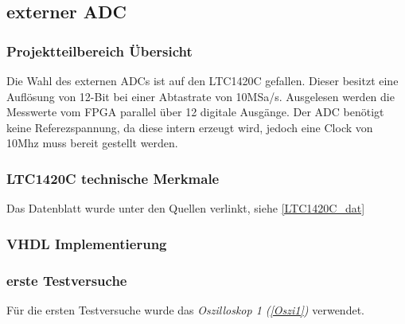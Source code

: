 \subsection{externer ADC}\label{extADC}
\subsubsection{Projektteilbereich Übersicht}
 Die Wahl des externen ADCs ist auf den LTC1420C gefallen. Dieser besitzt eine Auflösung von 12-Bit bei einer Abtastrate von 10MSa/s.  Ausgelesen werden die Messwerte vom FPGA parallel über 12 digitale Ausgänge. Der ADC benötigt keine Referezspannung, da diese intern erzeugt wird, jedoch eine Clock von 10Mhz muss bereit gestellt werden.
\subsubsection{LTC1420C technische Merkmale} \label{LTC1420C}
Das Datenblatt wurde unter den Quellen verlinkt, siehe \ref{LTC1420C_dat}
\subsubsection{VHDL Implementierung}
\subsubsection{erste Testversuche}
Für die ersten Testversuche wurde das \textit{Oszilloskop 1 (\ref{Oszi1})} verwendet.